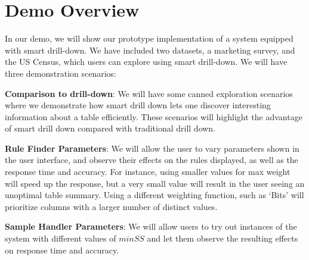 
\section{Demo Overview} \label{sec:demo} 
In our demo, we will show our prototype implementation of a system equipped with smart drill-down. We have included two datasets, a marketing survey, and the US Census, which users can explore using smart drill-down. We will have three demonstration scenarios:

\squishlist
\item {\bf Comparison to drill-down}: We will have some canned exploration scenarios where we demonstrate how smart drill down lets one discover interesting information about a table efficiently. These scenarios will highlight the advantage of smart drill down compared with traditional drill down. 
\item {\bf Rule Finder Parameters}: We will allow the user to vary parameters shown in the user interface, and observe their effects on the rules displayed, as well as the response time and accuracy. For instance, using smaller values for max weight will speed up the response, but a very small value will result in the user seeing an unoptimal table summary. Using a different weighting function, such as `Bits' will prioritize columns with a larger number of distinct values.
\item {\bf Sample Handler Parameters}: We will allow users to try out instances of the system with different values of $minSS$ and let them observe the resulting effects on response time and accuracy.
\squishend
